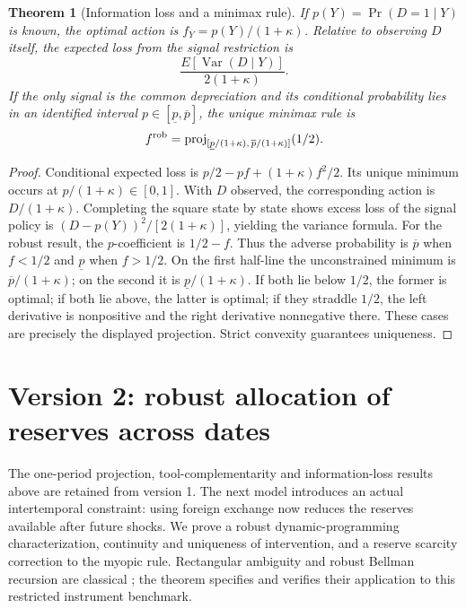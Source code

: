 \documentclass[11pt]{article}
\newtheorem{theorem}{Theorem}
\theoremstyle{definition}
\begin{document}
\begin{theorem}[Information loss and a minimax rule]
If $p(Y)=\Pr(D=1\mid Y)$ is known, the optimal action is $f_Y=p(Y)/(1+\kappa)$. Relative to observing $D$ itself, the expected loss from the signal restriction is
\[
 \frac{E[\operatorname{Var}(D\mid Y)]}{2(1+\kappa)}.
\]
If the only signal is the common depreciation and its conditional probability lies in an identified interval $p\in[\underline p,\overline p]$, the unique minimax rule is
\[
 f^{\rm rob}=\operatorname{proj}_{[\underline p/(1+\kappa),\,
                \overline p/(1+\kappa)]}(1/2).
\]
\end{theorem}
\begin{proof}
Conditional expected loss is $p/2-pf+(1+\kappa)f^2/2$. Its unique minimum occurs at $p/(1+\kappa)\in[0,1]$. With $D$ observed, the corresponding action is $D/(1+\kappa)$. Completing the square state by state shows excess loss of the signal policy is $(D-p(Y))^2/[2(1+\kappa)]$, yielding the variance formula.
For the robust result, the $p$-coefficient is $1/2-f$. Thus the adverse probability is $\overline p$ when $f<1/2$ and $\underline p$ when $f>1/2$. On the first half-line the unconstrained minimum is $\overline p/(1+\kappa)$; on the second it is $\underline p/(1+\kappa)$. If both lie below $1/2$, the former is optimal; if both lie above, the latter is optimal; if they straddle $1/2$, the left derivative is nonpositive and the right derivative nonnegative there. These cases are precisely the displayed projection. Strict convexity guarantees uniqueness.
\end{proof}


\section*{Version 2: robust allocation of reserves across dates}
The one-period projection, tool-complementarity and information-loss results
above are retained from version 1. The next model introduces an actual
intertemporal constraint: using foreign exchange now reduces the reserves
available after future shocks. We prove a robust dynamic-programming
characterization, continuity and uniqueness of intervention, and a reserve
scarcity correction to the myopic rule. Rectangular ambiguity and robust
Bellman recursion are classical \cite{iyengar}; the theorem specifies and
verifies their application to this restricted instrument benchmark.
\end{document}
